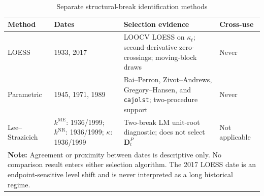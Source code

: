 \begin{table}[h!]
\centering\small
\caption{Separate structural-break identification methods}
\label{tab:breaks}
\begin{tabular}{p{2.1cm}p{3.3cm}p{6.0cm}p{1.4cm}}
\toprule
\textbf{Method} & \textbf{Dates} & \textbf{Selection evidence} & \textbf{Cross-use}\\
\midrule
LOESS & 1933, 2017 & LOOCV LOESS on $\kappa_t$; second-derivative zero-crossings; \LoessBootstrapDraws{} moving-block draws & Never \\
Parametric & 1945, 1971, 1989 & Bai--Perron, Zivot--Andrews, Gregory--Hansen, and \texttt{cajolst}; two-procedure support & Never \\
Lee--Strazicich & $k^{\mathrm{ME}}$: 1936/1999; $k^{\mathrm{NR}}$: 1936/1999; $\kappa$: 1936/1999 & Two-break LM unit-root diagnostic; does not select $\mathbf D_t^P$ & Not applicable \\
\bottomrule
\multicolumn{4}{p{13.1cm}}{\footnotesize \textbf{Note:} Agreement or proximity between dates is descriptive only. No comparison result enters either selection algorithm. The 2017 LOESS date is an endpoint-sensitive level shift and is never interpreted as a long historical regime.}
\end{tabular}
\end{table}
